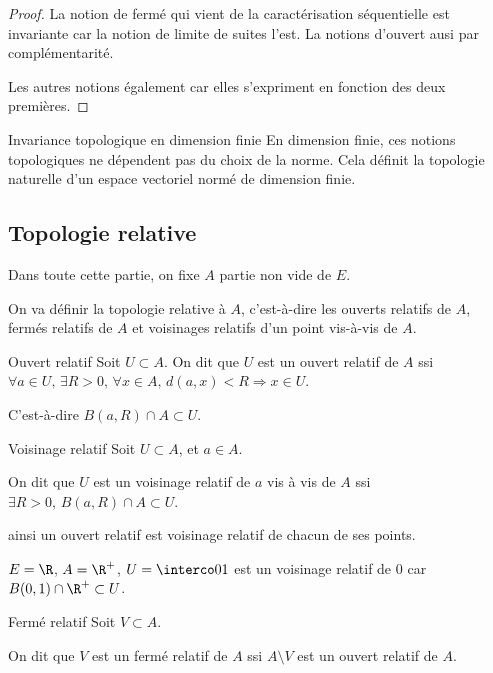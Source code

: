 \begin{proof}
    La notion de fermé qui vient de la caractérisation séquentielle est invariante car la notion de 
    limite de suites l'est. 
    La notions d'ouvert ausi par complémentarité. 

    Les autres notions également car elles s'expriment en fonction des deux premières.
\end{proof}


\begin{corollaire}{Invariance topologique en dimension finie}{}
    En dimension finie, ces notions topologiques ne dépendent pas du choix de la norme. Cela définit la topologie naturelle d'un espace vectoriel normé de dimension finie.
\end{corollaire}

\subsection{Topologie relative}

Dans toute cette partie, on fixe $A$ partie non vide de $E$.

On va définir la topologie relative à $A$, c'est-à-dire les ouverts relatifs de $A$, fermés relatifs de $A$ et voisinages relatifs d'un point vis-à-vis de $A$.

\begin{definition}{Ouvert relatif}{}
    Soit $U \subset A$. On dit que $U$ est un ouvert relatif de $A$ 
    ssi $\forall a \in U, \, \exists R > 0, \, \forall x \in A, \, d(a, x) < R \Rightarrow x \in U$.

    C'est-à-dire $B(a, R) \cap A \subset U$.
\end{definition}

\begin{definition}{Voisinage relatif}{}
    Soit $U \subset A$, et $a \in A$. 

    On dit que $U$ est un voisinage relatif de $a$ vis à vis de $A$ ssi 
    $\exists R > 0, \, B(a, R) \cap A \subset U$.

    ainsi un ouvert relatif est voisinage relatif de chacun de ses points.
\end{definition}

\begin{exemple}
    $E = \R$, $A = \R^+$, $U = \interco 0 1$ est un voisinage relatif de $0$ 
    car $B(0, 1) \cap \R^+ \subset U$. 
\end{exemple}

\begin{definition}{Fermé relatif}{}
    Soit $V \subset A$. 

    On dit que $V$ est un fermé relatif de $A$ ssi $A \setminus V$ est un ouvert relatif de $A$.
\end{definition}


